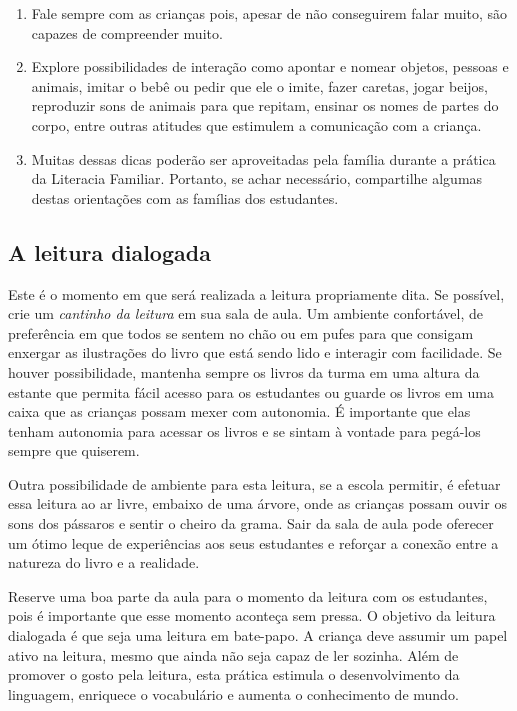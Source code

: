 \documentclass[11pt]{extarticle}
\begin{document}
\begin{enumerate}
\begin{enumerate}
\item Fale sempre com as crianças pois, apesar de não conseguirem 
falar muito, são capazes de compreender muito.

\item Explore possibilidades de interação como apontar e 
nomear objetos, pessoas e animais, imitar o bebê ou pedir que 
ele o imite, fazer caretas, jogar beijos, reproduzir sons de 
animais para que repitam, ensinar os nomes de partes do corpo, 
entre outras atitudes que estimulem a comunicação com a criança. 

\item Muitas dessas dicas poderão ser aproveitadas pela 
família durante a prática da Literacia Familiar. Portanto, 
se achar necessário, compartilhe algumas destas orientações 
com as famílias dos estudantes.
\end{enumerate}


\subsection{A leitura dialogada}
Este é o momento em que será realizada a leitura propriamente dita. 
Se possível, crie um \textit{cantinho da leitura} em sua sala de aula. Um 
ambiente confortável, de preferência em que todos se sentem no chão ou 
em pufes para que consigam enxergar as ilustrações do livro que está 
sendo lido e interagir com facilidade. Se houver possibilidade, mantenha 
sempre os livros da turma em uma altura da estante que permita fácil 
acesso para os estudantes ou guarde os livros em uma caixa que as crianças 
possam mexer com autonomia. É importante que elas tenham autonomia para 
acessar os livros e se sintam à vontade para pegá-los sempre que quiserem. 

Outra possibilidade de ambiente para esta leitura, se a escola permitir, 
é efetuar essa leitura ao ar livre, embaixo de uma árvore, onde as crianças 
possam ouvir os sons dos pássaros e sentir o cheiro da grama. Sair da sala 
de aula pode oferecer um ótimo leque de experiências aos seus estudantes e 
reforçar a conexão entre a natureza do livro e a realidade.  

Reserve uma boa parte da aula para o momento da leitura com os estudantes, 
pois é importante que esse momento aconteça sem pressa. O objetivo da 
leitura dialogada é que seja uma leitura em bate-papo. A criança deve 
assumir um papel ativo na leitura, mesmo que ainda não seja capaz de 
ler sozinha. Além de promover o gosto pela leitura, esta prática estimula 
o desenvolvimento da linguagem, enriquece o vocabulário e 
aumenta o conhecimento de mundo.


\end{enumerate}
\end{document}
